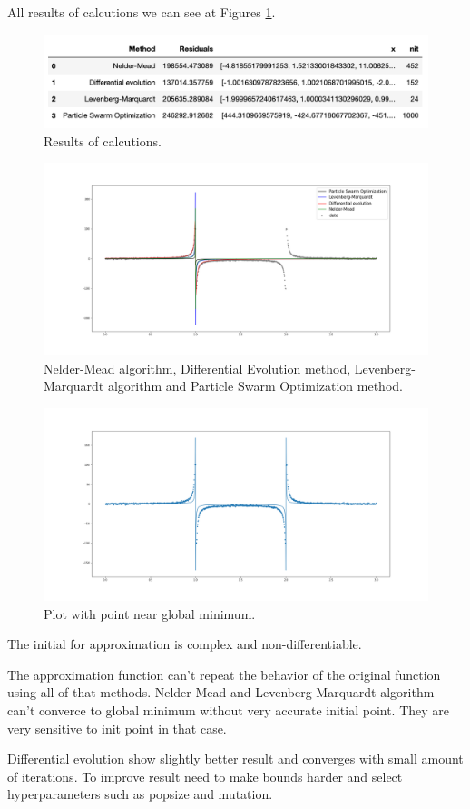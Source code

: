 \documentclass[a4paper,article,14pt]{extarticle}
\begin{document}
	All results of calcutions we can see at Figures \ref{results}.
	\begin{figure}[h!]
		\centering
		\includegraphics[scale=0.7]{results.png}
		\caption{Results of calcutions.}
		\label{results}
	\end{figure}
	
	\begin{figure}[h!]
		\centering
		\includegraphics[scale=0.35]{plot_approximation.png}
		\caption{Nelder-Mead algorithm, Differential Evolution method, Levenberg-Marquardt algorithm and Particle Swarm Optimization method.}
		\label{linear}
	\end{figure} 
	
	\begin{figure}[h]
		\centering
		\includegraphics[scale=0.35]{plot_near_min.png}
		\caption{Plot with point near global minimum.}
		\label{rational}
	\end{figure} 
	
	The initial for approximation is complex and non-differentiable. 
	
	The approximation function can’t repeat the behavior of the original function using all of that methods. Nelder-Mead and Levenberg-Marquardt algorithm can’t converce to global minimum without very accurate initial point. They are very sensitive to init point in that case.
	
	Differential evolution show slightly better result and converges with small amount of iterations. To improve result need to make bounds harder and select hyperparameters such as popsize and mutation.
	

	
\end{document}
